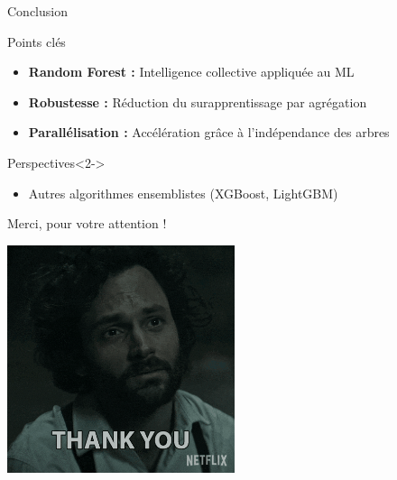\documentclass{beamer}
\begin{document}
	\begin{frame}{Conclusion}
		\begin{block}{Points clés}
			\begin{itemize}
				\item<1-> \textbf{Random Forest :} Intelligence collective appliquée au ML
				\item<1-> \textbf{Robustesse :} Réduction du surapprentissage par agrégation
				\item<1-> \textbf{Parallélisation :} Accélération grâce à l'indépendance des arbres
			\end{itemize}
		\end{block}
		
		\begin{block}{Perspectives}<2->
			\begin{itemize}
				\item<2-> Autres algorithmes ensemblistes (XGBoost, LightGBM)
			\end{itemize}
		\end{block}
	\end{frame}
	
	\begin{frame}{Merci, pour votre attention !}
		\begin{center}
			\includegraphics[width=0.5\textwidth]{assets/thank-35.png}
		\end{center}
	\end{frame}
	
\end{document}
